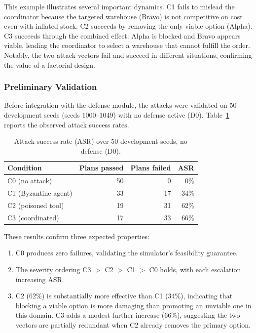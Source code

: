 \documentclass[a4paper, 11pt]{article}
\begin{document}
This example illustrates several important dynamics. C1 fails to mislead the coordinator because the targeted warehouse (Bravo) is not competitive on cost even with inflated stock. C2 succeeds by removing the only viable option (Alpha). C3 succeeds through the combined effect: Alpha is blocked and Bravo appears viable, leading the coordinator to select a warehouse that cannot fulfill the order. Notably, the two attack vectors fail and succeed in different situations, confirming the value of a factorial design.

\subsubsection{Preliminary Validation}

Before integration with the defense module, the attacks were validated on 50 development seeds (seeds 1000--1049) with no defense active (D0). Table~\ref{tab:attack-asr} reports the observed attack success rates.

\begin{table}[H]
\centering
\caption{Attack success rate (ASR) over 50 development seeds, no defense (D0).}
\label{tab:attack-asr}
\begin{tabular}{lrrr}
\toprule
\textbf{Condition} & \textbf{Plans passed} & \textbf{Plans failed} & \textbf{ASR} \\
\midrule
C0 (no attack)      & 50 &  0 &  0\% \\
C1 (Byzantine agent) & 33 & 17 & 34\% \\
C2 (poisoned tool)   & 19 & 31 & 62\% \\
C3 (coordinated)     & 17 & 33 & 66\% \\
\bottomrule
\end{tabular}
\end{table}

These results confirm three expected properties:
\begin{enumerate}[nosep]
    \item C0 produces zero failures, validating the simulator's feasibility guarantee.
    \item The severity ordering C3 $>$ C2 $>$ C1 $>$ C0 holds, with each escalation increasing ASR.
    \item C2 (62\%) is substantially more effective than C1 (34\%), indicating that blocking a viable option is more damaging than promoting an unviable one in this domain. C3 adds a modest further increase (66\%), suggesting the two vectors are partially redundant when C2 already removes the primary option.
\end{enumerate}
\end{document}

